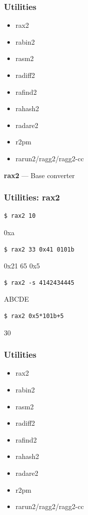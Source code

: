 \documentclass[10pt,pdf,utf8,english,compress,hyperref={unicode}]{beamer}
\begin{document}
\begin{frame}[fragile]
  \frametitle{Utilities}
     \begin{itemize}
        \item \alert{rax2}
        \item rabin2
        \item rasm2
        \item radiff2
        \item rafind2
        \item rahash2
        \item radare2
        \item r2pm
        \item rarun2/ragg2/ragg2-cc
      \end{itemize}
\end{frame}

\begin{frame}[fragile]
  \center\textbf{rax2} — Base converter
  \noindent\makebox[\linewidth]{\rule{\paperwidth}{0.4pt}}
  \frametitle{Utilities: rax2}
  \begin{verbatim}$ rax2 10\end{verbatim}
  \alert{0xa}
  \begin{verbatim}$ rax2 33 0x41 0101b\end{verbatim}
  \alert{0x21 65 0x5}
  \begin{verbatim}$ rax2 -s 4142434445\end{verbatim}
  \alert{ABCDE}
  \begin{verbatim}$ rax2 0x5*101b+5\end{verbatim}
  \alert{30}

\end{frame}

\begin{frame}[fragile]
  \frametitle{Utilities}
     \begin{itemize}
        \item rax2
        \item \alert{rabin2}
        \item rasm2
        \item radiff2
        \item rafind2
        \item rahash2
        \item radare2
        \item r2pm
        \item rarun2/ragg2/ragg2-cc
      \end{itemize}
\end{frame}
\end{document}
